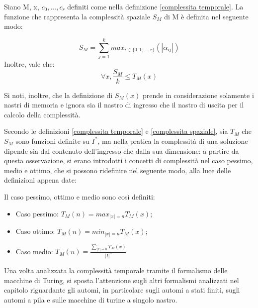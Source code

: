   \begin{definition} \label{complessita spaziale}
    Siano M, x, \(c_0,...,c_r\) definiti come nella definizione \ref{complessita temporale}. La funzione che rappresenta la complessità spaziale \({S}_M\) di M è definita nel seguente modo:

    \begin{equation*}
      \displaystyle {S}_M=\sum_{j=1}^{k} max_{i\in\{0,1,...,r\}}(|\alpha_{ij}|)
    \end{equation*}
    Inoltre, vale che:
    \begin{equation*}
      \forall x, \frac{{S}_M}{k}\le {T}_M(x)
    \end{equation*}
  \end{definition}

  Si noti, inoltre, che la definizione di \({S}_M(x)\) prende in considerazione solamente i nastri di memoria e ignora sia il nastro di ingresso che il nastro di uscita per il calcolo della complessità.

  Secondo le definizioni \ref{complessita temporale} e \ref{complessita spaziale}, sia \({T}_M\) che \({S}_M\) sono funzioni definite su \(I^*\), ma nella pratica la complessità di una soluzione dipende sia dal contenuto dell'ingresso che dalla sua dimensione: a partire da questa osservazione, si erano introdotti i concetti di complessità nel caso pessimo, medio e ottimo, che si possono ridefinire nel seguente modo, alla luce delle definizioni appena date:

  \begin{definition}
    Il caso pessimo, ottimo e medio sono così definiti:
    \begin{itemize}
      \item Caso pessimo: \({T}_M(n)=max_{|x|=n}{T}_M(x)\);
      \item Caso ottimo: \({T}_M(n)=min_{|x|=n}{T}_M(x)\);
      \item Caso medio: \(\displaystyle {T}_M(n)=\frac{\sum_{|x|=n}{T}_M(x)}{|I|^n}\)
    \end{itemize}
  \end{definition}

  Una volta analizzata la complessità temporale tramite il formalismo delle macchine di Turing, si sposta l'attenzione sugli altri formalismi analizzati nel capitolo riguardante gli automi, in particolare sugli automi a stati finiti, sugli automi a pila e sulle macchine di turine a singolo nastro.

  \vspace*{10px}

